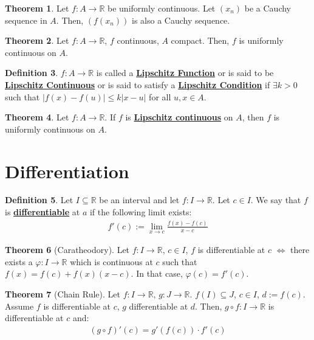 \documentclass[reqno,11pt]{amsart}
\theoremstyle{definition}
\newtheorem{theorem}{Theorem}
\theoremstyle{definition}
\newtheorem{definition}[theorem]{Definition}
\theoremstyle{remark}
\newcommand{\R}{\mathbb{R}}
\newcommand{\dfn}[1]{\underline{\textbf{#1}}}
\begin{document}
\begin{theorem}
	Let $f: A \rightarrow \R$ be uniformly continuous. Let $(x_n)$ be a Cauchy sequence in $A$. Then, $(f(x_n))$ is also a Cauchy sequence. 
\end{theorem}

\begin{theorem}
	Let $f: A \rightarrow \R$, $f$ continuous, $A$ compact. Then, $f$ is uniformly continuous on $A$. 
\end{theorem}

\begin{definition}
	$f: A \rightarrow \R$ is called a \dfn{Lipschitz Function} or is said to be \dfn{Lipschitz Continuous} or is said to satisfy a \dfn{Lipschitz Condition} if $\exists k > 0$ such that $|f(x) - f(u)| \leq k |x-u|$ for all $u, x \in A$.
\end{definition}

\begin{theorem}
	Let $f: A \rightarrow \R$. If $f$ is \dfn{Lipschitz continuous} on $A$, then $f$ is uniformly continuous on $A$.
\end{theorem}

\section{Differentiation}
\begin{definition}
	Let $I \subseteq \R$ be an interval and let $f: I \rightarrow \R$. Let $c \in I$. We say that $f$ is \dfn{differentiable} at $a$ if the following limit exists:
	\begin{align}
		f'(c) := \lim_{x \rightarrow c} \frac{f(x) - f(c)}{x-c}	
	\end{align}
\end{definition}

\begin{theorem}[Caratheodory]
	Let $f: I \rightarrow \R$, $c \in I$, $f$ is differentiable at $c$ $\iff$ there exists a $\varphi: I \rightarrow \R$ which is continuous at $c$ such that $f(x) = f(c) + f(x)(x-c)$. In that case, $\varphi(c) = f'(c)$.
\end{theorem}

\begin{theorem}[Chain Rule]
	Let $f: I \rightarrow \R$, $g: J \rightarrow \R$. $f(I) \subseteq J$, $c \in I$, $d:=f(c)$. Assume $f$ is differentiable at $c$, $g$ differentiable at $d$. Then, $g \circ f: I \rightarrow \R$ is differentiable at $c$ and:
	\begin{align}
		(g \circ f)'(c) = g'(f(c)) \cdot f'(c) 	
	\end{align}
\end{theorem}
\end{document}
